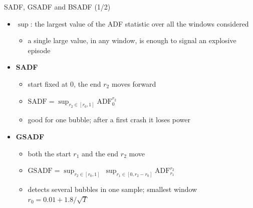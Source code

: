 \begin{frame}{SADF, GSADF and BSADF (1/2)}
\itemsize{\small}
\begin{itemize}
    \item $\sup$: the largest value of the ADF statistic over all the windows considered
    \begin{itemize}
        \item a single large value, in any window, is enough to signal an explosive episode
    \end{itemize}
    \item \textbf{SADF} 
    \begin{itemize}
        \item start fixed at 0, the end $r_2$ moves forward
        \item $\mathrm{SADF} = \sup_{r_2 \in [r_0, 1]} \mathrm{ADF}_{0}^{r_2}$
        \item good for one bubble; after a first crash it loses power
    \end{itemize}
    \item \textbf{GSADF} 
    \begin{itemize}
        \item both the start $r_1$ and the end $r_2$ move
        \item $\mathrm{GSADF} = \sup_{r_2 \in [r_0,1]}\ \sup_{r_1 \in [0, r_2 - r_0]} \mathrm{ADF}_{r_1}^{r_2}$
        \item detects several bubbles in one sample; smallest window $r_0 = 0.01 + 1.8/\sqrt{T}$
    \end{itemize}
\end{itemize}
\end{frame}

